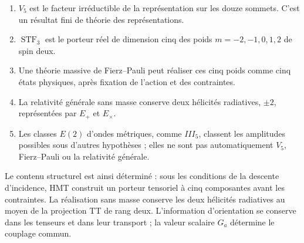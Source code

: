 \begin{enumerate}
\item \(V_5\) est le facteur irréductible de la représentation sur les
douze sommets. C’est un résultat fini de théorie des représentations.
\item \(\operatorname{STF}_3\) est le porteur réel de dimension cinq des
poids \(m=-2,-1,0,1,2\) de spin deux.
\item Une théorie massive de Fierz--Pauli peut réaliser ces cinq poids
comme cinq états physiques, après fixation de l’action et des contraintes.
\item La relativité générale sans masse conserve deux hélicités radiatives,
\(\pm2\), représentées par \(E_+\) et \(E_\times\).
\item Les classes \(E(2)\) d’ondes métriques, comme \(III_5\), classent
les amplitudes possibles sous d’autres hypothèses ; elles ne sont pas automatiquement
\(V_5\), Fierz--Pauli ou la relativité générale.
\end{enumerate}

Le contenu structurel est ainsi déterminé : sous les conditions de la
descente d’incidence, HMT construit un porteur tensoriel à cinq
composantes avant les contraintes. La réalisation sans masse conserve
les deux hélicités radiatives au moyen de la projection TT de rang deux.
L’information d’orientation se conserve dans les tenseurs et dans leur
transport ; la valeur scalaire \(G_a\) détermine le couplage commun.
